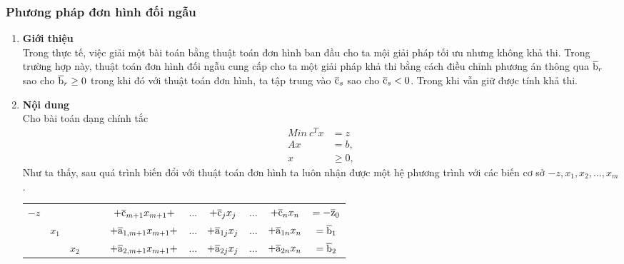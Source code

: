 \documentclass{article}
\begin{document}
                \subsubsection{Phương pháp đơn hình đối ngẫu}
                \begin{enumerate}
                    \item \textbf{Giới thiệu} \\
                        Trong thực tế, việc giải một bài toán bằng thuật toán đơn hình ban đầu cho ta mội giải pháp tối ưu nhưng không khả thi. Trong trường hợp này, thuật toán đơn hình đối ngẫu cung cấp cho ta một giải pháp khả thi bằng cách điều chỉnh phương án thông qua $\overline{\rm b}_r$ sao cho $\overline{\rm b}_r \geq 0$ trong khi đó với thuật toán đơn hình, ta tập trung vào $\overline{\rm c}_s$ sao cho $\overline{\rm c}_s < 0$. Trong khi vẫn giữ được tính khả thi.
                    \item \textbf{Nội dung} \\
                        Cho bài toán dạng chính tắc
                        \begin{equation}
                            \begin{split}
                                Min \: c^Tx &= z\\
                                Ax &= b,\\ 
                                x &\geq 0,
                            \end{split}
                        \end{equation}        
                        Như ta thấy, sau quá trình biến đổi với thuật toán đơn hình ta luôn nhận được một hệ phương trình với các biến cơ sở $-z, x_1, x_2, \ldots , x_m$.
                        \begin{center}
                            \begin{tabular} {ccccccccccc}
                                $-z$ &&&&& $+\overline{\rm c}_{m+1}x_{m+1}+$ & $\ldots$ & $+ \overline{\rm c}_jx_j$ & $\ldots$ & $+ \overline{\rm c}_nx_n$ & $= -\overline{\rm z}_0$ \\
                                & $x_1$ &&&& $+\overline{\rm a}_{1,m+1}x_{m+1}+$ & $\ldots$ & $+ \overline{\rm a}_{1j}x_j$ & $\ldots$ & $+ \overline{\rm a}_{1n}x_n$ & $= \overline{\rm b}_1$ \\                            
                                && $x_2$ &&& $+\overline{\rm a}_{2,m+1}x_{m+1}+$ & $\ldots$ & $+ \overline{\rm a}_{2j}x_j$ & $\ldots$ & $+ \overline{\rm a}_{2n}x_n$ & $= \overline{\rm b}_2$ \\                            

\end{tabular}
\end{center}
\end{enumerate}
\end{document}
